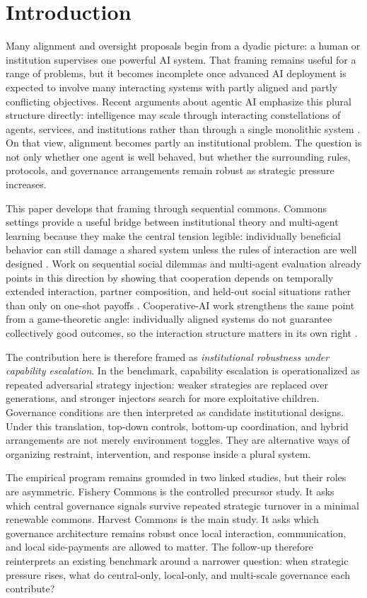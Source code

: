 \section{Introduction}

Many alignment and oversight proposals begin from a dyadic picture: a human or institution supervises one powerful AI system. That framing remains useful for a range of problems, but it becomes incomplete once advanced AI deployment is expected to involve many interacting systems with partly aligned and partly conflicting objectives. Recent arguments about agentic AI emphasize this plural structure directly: intelligence may scale through interacting constellations of agents, services, and institutions rather than through a single monolithic system \citep{evans2025agentic}. On that view, alignment becomes partly an institutional problem. The question is not only whether one agent is well behaved, but whether the surrounding rules, protocols, and governance arrangements remain robust as strategic pressure increases.

This paper develops that framing through sequential commons. Commons settings provide a useful bridge between institutional theory and multi-agent learning because they make the central tension legible: individually beneficial behavior can still damage a shared system unless the rules of interaction are well designed \citep{gordon1954common,scott1955fishery,ostrom1990governing}. Work on sequential social dilemmas and multi-agent evaluation already points in this direction by showing that cooperation depends on temporally extended interaction, partner composition, and held-out social situations rather than only on one-shot payoffs \citep{leibo2017multiagent,meltingpot2021,socialjax2025}. Cooperative-AI work strengthens the same point from a game-theoretic angle: individually aligned systems do not guarantee collectively good outcomes, so the interaction structure matters in its own right \citep{conitzer2023foundations}.

The contribution here is therefore framed as \emph{institutional robustness under capability escalation}. In the benchmark, capability escalation is operationalized as repeated adversarial strategy injection: weaker strategies are replaced over generations, and stronger injectors search for more exploitative children. Governance conditions are then interpreted as candidate institutional designs. Under this translation, top-down controls, bottom-up coordination, and hybrid arrangements are not merely environment toggles. They are alternative ways of organizing restraint, intervention, and response inside a plural system.

The empirical program remains grounded in two linked studies, but their roles are asymmetric. Fishery Commons is the controlled precursor study. It asks which central governance signals survive repeated strategic turnover in a minimal renewable commons. Harvest Commons is the main study. It asks which governance architecture remains robust once local interaction, communication, and local side-payments are allowed to matter. The follow-up therefore reinterprets an existing benchmark around a narrower question: when strategic pressure rises, what do central-only, local-only, and multi-scale governance each contribute?
